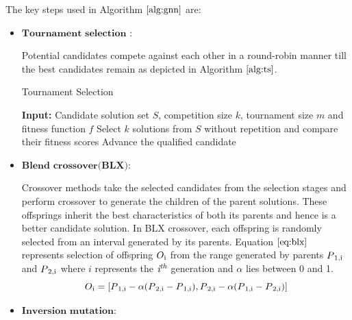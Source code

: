 \documentclass[conference]{IEEEtran}
\theoremstyle{definition}
\begin{document}
The key steps used in Algorithm $\ref{alg:gnn}$ are:
\begin{itemize}
\item $\textbf{Tournament selection }$: 

Potential candidates compete against each other in a round-robin manner till the best candidates remain as depicted in Algorithm $\ref{alg:ts}$.
\begin{algorithm}[t]
\scriptsize
\caption{Tournament Selection}
\label{alg:ts}
\begin{algorithmic}[1]
\STATE \textbf{Input:} Candidate solution set $\textit{S}$, competition size $\textit{k}$,  tournament size $\textit{m}$ and fitness function $\textit{f}$
\STATE Select $\textit{k}$ solutions from $\textit{S}$ without repetition and compare their fitness scores
\STATE Advance the qualified candidate
\ENDFOR
\end{algorithmic}
\end{algorithm}
\item 
$\textbf{Blend crossover(BLX)}$: 

Crossover methods take the selected candidates from the selection stages and perform crossover to generate the children of the parent solutions. These offsprings inherit the best characteristics of both its parents and hence is a better candidate solution. In BLX crossover, each offspring is randomly selected from an interval generated by its parents.
Equation $\ref{eq:blx}$ represents selection of offspring $O\textsubscript{i}$ from the range generated by parents $P\textsubscript{1,i}$ and $P\textsubscript{2,i}$ where $\textit{i}$ represents the $\textit{i\textsuperscript{th}}$ generation and $\alpha$ lies between 0 and 1.
\begin{equation}
\label{eq:blx}
O\textsubscript{i} = [P\textsubscript{1,i} - \alpha(P\textsubscript{2,i} - P\textsubscript{1,i}), P\textsubscript{2,i} - \alpha(P\textsubscript{1,i} - P\textsubscript{2,i})] \scriptsize 
\end{equation}
\item $\textbf{Inversion mutation}$: 


\end{itemize}
\end{document}
